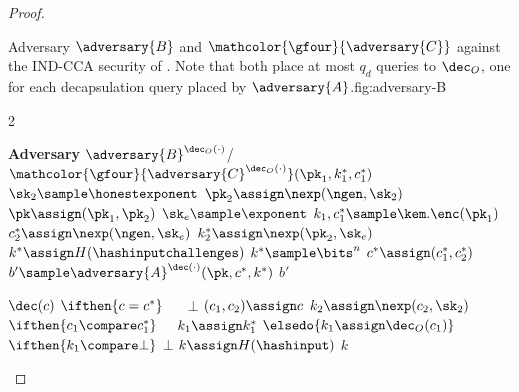 \begin{proof}
                    \begin{gamefigure}{Adversary $\adversary{B}$ and $\mathcolor{\gfour}{\adversary{C}}$ against the IND-CCA security of \kem. Note that both place at most $q_d$ queries to $\dec_O$, one for each decapsulation query placed by $\adversary{A}$.}{fig:adversary-B}
                        \begin{games}{2}
                            \begin{gameenv}{\textbf{Adversary} $\adversary{B}^{\dec_O(\cdot)}$/$\mathcolor{\gfour}{\adversary{C}^{\dec_O(\cdot)}}(\pk_1, k^*_1, c^*_1)$}
                                \State $\sk_2 \sample \honestexponent$
                                \State $\pk_2 \assign \nexp(\ngen, \sk_2)$
                                \State $\pk \assign (\pk_1, \pk_2)$
                                \State $\sk_e \sample \exponent$
                                \State $k_1, c^*_1 \sample \kem.\enc(\pk_1)$
                                \State $c^*_2 \assign \nexp(\ngen, \sk_e)$
                                \State $k^*_2 \assign \nexp(\pk_2, \sk_e)$
                                \State $k^* \assign H(\hashinputchallenges)$ \label{line:b-real-hqb}
                                \BeginBox[draw=\gfour]
                                \State $k^* \sample \bits^{n}$ \label{line:b-sampled-hqb}
                                \EndBox
                                \State $c^* \assign (c_1^*, c_2^*)$
                                \State $b' \sample \adversary{A}^{\dec(\cdot)}(\pk, c^*, k^*)$
                                \State \Return $b'$
                            \end{gameenv}
                            \gamebreak
                            \begin{gameenv}{\oracle $\dec(c)$}
                                \State $\ifthen{c = c^*}$
                                    \State $\quad$ \Return $\bot$
                                    \State $(c_1, c_2) \assign c$
                                    \State $k_2 \assign \nexp(c_2, \sk_2)$
                                    \State $\ifthen{c_1 \compare c^*_1}$
                                        \State $\quad k_1 \assign k^*_1$
                                        \State $\elsedo{k_1 \assign \dec_O(c_1)}$
                                        \State $\ifthen{k_1 \compare \bot}$
                                            \State \quad \Return $\bot$
                                            \State $k \assign H(\hashinput)$
                                            \State \Return $k$
                                        \end{gameenv}
                                    \end{games}
                                \end{gamefigure}



\end{proof}
